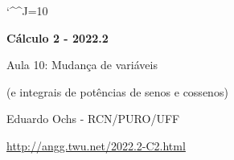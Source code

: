 \documentclass[oneside,12pt]{article}
\begin{document}
\catcode`\^^J=10
\pu
\def\pictgridstyle{\color{GrayPale}\linethickness{0.3pt}}
\def\pictaxesstyle{\linethickness{0.5pt}}
\def\pictnaxesstyle{\color{GrayPale}\linethickness{0.5pt}}
\celllower=2.5pt


\def\u#1{\par{\footnotesize \url{#1}}}

\def\drafturl{http://angg.twu.net/LATEX/2022-2-C2.pdf}
\def\drafturl{http://angg.twu.net/2022.2-C2.html}
\def\draftfooter{\tiny \href{\drafturl}{\jobname{}} \ColorBrown{\shorttoday{} \hours}}



%

\thispagestyle{empty}

\begin{center}

\vspace*{1.2cm}

{\bf \Large Cálculo 2 - 2022.2}

\bsk

Aula 10: Mudança de variáveis

(e integrais de potências de senos e cossenos)

\bsk

Eduardo Ochs - RCN/PURO/UFF

\url{http://angg.twu.net/2022.2-C2.html}

\end{center}

\newpage

%                           
\end{document}
